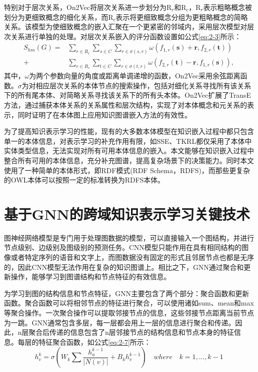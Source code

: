 特别对于层次关系，On2Vec将层次关系进一步划分为R$_{r}$和R$_{c}$，R$_{r}$表示粗略概念被划分为更细致概念的细化关系，而R$_{c}$表示将更细致概念分组为更粗略概念的简略关系。该模型为使细致概念的嵌入汇聚在一个更紧密的邻域内，采用层次模型对层次关系进行单独的处理。对层次关系嵌入的评分函数设置如公式\ref{eq:2-3}所示：
\begin{equation}
  \begin{aligned} 
    S_{hm}(G) = &\sum_{r\in R_{r}} \sum_{s\in C} \sum_{r\in \sigma(s,r)} \omega(f_{1,r}(\textbf{s}) + \textbf{r},f_{2,r}(\textbf{t}))\\
    + &\sum_{r\in R_{c}} \sum_{t\in C} \sum_{r\in \sigma(t,r)} \omega(f_{2,r}(\textbf{t}) -\textbf{r},f_{1,r}(\textbf{s})),
    \end{aligned} \label{eq:2-3}
\end{equation}
其中，\(\omega\)为两个参数向量的角度或距离单调递增的函数，On2Vec采用余弦距离函数。\(\sigma\)为对相应层次关系的本体节点的搜索操作，包括对细化关系寻找所有该关系下的所有尾本体、对简略关系寻找该关系下的所有头本体。On2Vec扩展了TransE方法，通过捕获本体关系的关系属性和层次结构，实现了对本体概念和元关系的表示，同时证明了在本体图上应用知识图谱嵌入方法的有效性。

为了提高知识表示学习的性能，现有的大多数本体模型在知识嵌入过程中都只包含单一的本体信息，对表示学习的补充作用有限，如SSE\cite{guo2016sse}、TKRL\cite{xie2016representation-TKRL}都仅采用了本体中实体类型信息，无法实现对所有可用本体信息的嵌入。本文能够在知识嵌入过程中整合所有可用的本体信息，充分补充图谱，提高复杂场景下的决策能力。同时本文使用了一种简单的本体形式，即RDF模式(RDF Schema，RDFS)，而那些更复杂的OWL本体可以按照一定的标准转换为RDFS本体。

\section{基于GNN的跨域知识表示学习关键技术}
图神经网络模型是专门用于处理图数据的模型，可以直接输入一个图结构，并进行节点级别、边级别及图级别的预测任务。CNN模型只能作用在具有相同结构的图像或者特定序列的语音和文字上，而图数据没有固定的形式且邻居节点也都是无序的，因此CNN模型无法作用在复杂的知识图谱上。相比之下，GNN通过聚合和更新操作，能够学习到图谱结构和节点特征的有效信息。

为学习到图的结构信息和节点特征，GNN主要包含了两个部分：聚合函数和更新函数。聚合函数可以将相邻节点的特征进行聚合，可以使用诸如sum、mean和max等聚合操作。一次聚合操作可以提取邻接节点的信息，这些邻接节点距离当前节点为一跳。GNN通常包含多层，每一层都会用上一层的信息进行聚合和传递。因此，n层聚合后传递的信息包含了n层邻接节点的结构信息和节点本身的特征信息。每层的特征聚合函数，如公式\ref{eq:2-7}所示：
\begin{equation}
  h_{v}^{k} = \sigma(W_{k} \sum \frac{h_{u}^{k-1}}{|N(v)|} + B_{k}h_{v}^{k-1}) \quad where \quad k = 1, ..., k-1 \label{eq:2-7}
\end{equation}


